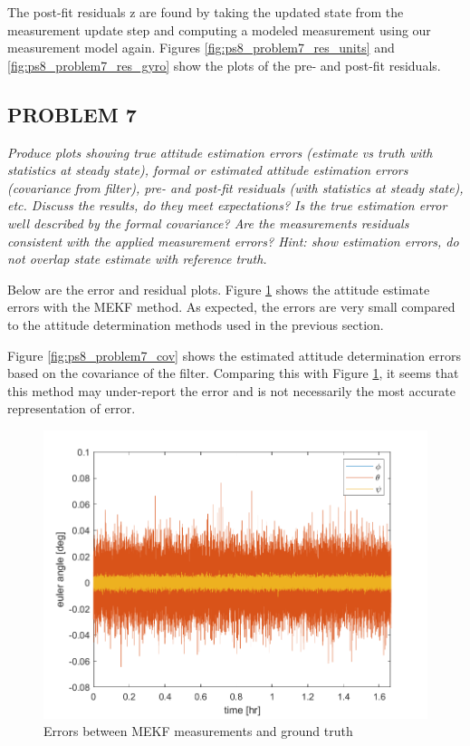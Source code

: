 The post-fit residuals z are found by taking the updated state from the measurement update step and computing a modeled measurement using our measurement model again. Figures \ref{fig:ps8_problem7_res_units} and \ref{fig:ps8_problem7_res_gyro} show the plots of the pre- and post-fit residuals.

\subsection{PROBLEM 7}
\textit{Produce plots showing true attitude estimation errors (estimate vs truth with statistics at steady state), formal or estimated attitude estimation errors (covariance from filter), pre- and post-fit residuals (with statistics at steady state), etc. Discuss the results, do they meet expectations? Is the true estimation error well described by the formal covariance? Are the measurements residuals consistent with the applied measurement errors? Hint: show estimation errors, do not overlap state estimate with reference truth.}

Below are the error and residual plots. Figure \ref{fig:ps8_problem7_error} shows the attitude estimate errors with the MEKF method. As expected, the errors are very small compared to the attitude determination methods used in the previous section.

Figure \ref{fig:ps8_problem7_cov} shows the estimated attitude determination errors based on the covariance of the filter. Comparing this with Figure \ref{fig:ps8_problem7_error}, it seems that this method may under-report the error and is not necessarily the most accurate representation of error.

\begin{figure}[H]
\centering
\includegraphics[scale=0.8]{Images/ps8_problem7_error.png}
\caption{Errors between MEKF measurements and ground truth}
\label{fig:ps8_problem7_error}
\end{figure}

